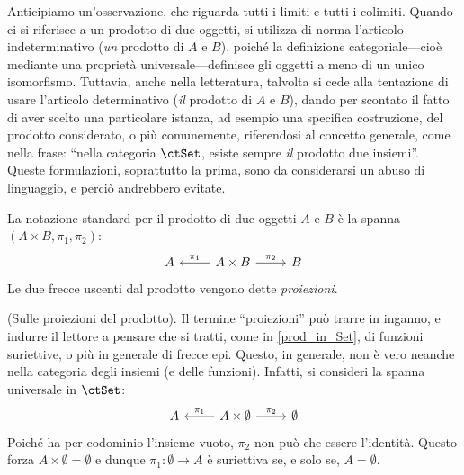 \begin{remark}
Anticipiamo un'osservazione, che riguarda tutti i limiti e tutti i colimiti. Quando ci si riferisce a un prodotto di due oggetti, si utilizza di norma l'articolo indeterminativo (\emph{un} prodotto di \(A\) e \(B\)), poiché la definizione categoriale---cioè mediante una proprietà universale---definisce gli oggetti a meno di un unico isomorfismo. Tuttavia, anche nella letteratura, talvolta si cede alla tentazione di usare l'articolo determinativo (\emph{il} prodotto di \(A\) e \(B\)), dando per scontato il fatto di aver scelto una particolare istanza, ad esempio una specifica costruzione, del prodotto considerato, o più comunemente, riferendosi al concetto generale, come nella frase: ``nella categoria \(\ctSet\), esiste sempre \emph{il} prodotto due insiemi''.  Queste formulazioni, soprattutto la prima, sono da considerarsi un abuso di linguaggio, e perciò andrebbero evitate.
\end{remark}
\begin{notation} La notazione standard per il prodotto di due oggetti \(A\) e  \(B\) è la spanna \((A\times B,\pi_1,\pi_2)\):
\[
\begin{tikzcd}
	A&A\times B\ar[l, "\pi_1"']\ar[r, "\pi_2"]&B
\end{tikzcd}
\]
Le due frecce uscenti dal prodotto vengono dette \emph{proiezioni}.
\end{notation}


\begin{remark}(Sulle proiezioni del prodotto).
Il termine ``proiezioni'' può trarre in inganno, e indurre il lettore a pensare che si tratti, come in \ref{prod_in_Set}, di funzioni suriettive, o più in generale di frecce epi. Questo, in generale, non è vero neanche nella categoria degli insiemi (e delle funzioni). Infatti, si consideri la spanna universale in  \(\ctSet\):
\[
\begin{tikzcd}
	A&A\times \emptyset\ar[l, "\pi_1"']\ar[r, "\pi_2"]&\emptyset
\end{tikzcd}
\]
Poiché ha per codominio l'insieme vuoto, \(\pi_2\) non può che essere l'identità. Questo forza \(A\times \emptyset=\emptyset\) e dunque \(\pi_1\colon \emptyset\to A\) è suriettiva se, e solo se, \(A=\emptyset\). 
\end{remark}
	
